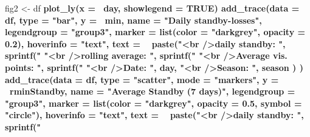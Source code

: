 \documentclass[
]{book}
\newenvironment{Shaded}{\begin{snugshade}}{\end{snugshade}}
\newcommand{\DataTypeTok}[1]{\textcolor[rgb]{0.13,0.29,0.53}{#1}}
\newcommand{\FloatTok}[1]{\textcolor[rgb]{0.00,0.00,0.81}{#1}}
\newcommand{\KeywordTok}[1]{\textcolor[rgb]{0.13,0.29,0.53}{\textbf{#1}}}
\newcommand{\NormalTok}[1]{#1}
\newcommand{\OperatorTok}[1]{\textcolor[rgb]{0.81,0.36,0.00}{\textbf{#1}}}
\newcommand{\OtherTok}[1]{\textcolor[rgb]{0.56,0.35,0.01}{#1}}
\newcommand{\StringTok}[1]{\textcolor[rgb]{0.31,0.60,0.02}{#1}}
\let\oldShaded\Shaded
\let\endoldShaded\endShaded
\renewenvironment{Shaded}{\footnotesize\oldShaded}{\endoldShaded}
\begin{document}
\begin{Shaded}
\begin{Highlighting}[]
{{{{{{{{{{{{{{{{{{{{{{{{{{{{{{{{{{{{{{{{{{{{{{{{{{{{{{{{{{{{{\NormalTok{fig2 <-}\StringTok{ }\NormalTok{df }\OperatorTok{%
\StringTok{  }\KeywordTok{plot_ly}\NormalTok{(}\DataTypeTok{x =} \OperatorTok{~}\NormalTok{day, }\DataTypeTok{showlegend =} \OtherTok{TRUE}\NormalTok{) }\OperatorTok{%
\StringTok{  }\KeywordTok{add_trace}\NormalTok{(}\DataTypeTok{data =}\NormalTok{ df,}
            \DataTypeTok{type =} \StringTok{"bar"}\NormalTok{,}
            \DataTypeTok{y =} \OperatorTok{~}\NormalTok{min,}
            \DataTypeTok{name =} \StringTok{"Daily standby-losses"}\NormalTok{,}
            \DataTypeTok{legendgroup =} \StringTok{"group3"}\NormalTok{,}
            \DataTypeTok{marker =} \KeywordTok{list}\NormalTok{(}\DataTypeTok{color =} \StringTok{"darkgrey"}\NormalTok{, }\DataTypeTok{opacity =} \FloatTok{0.2}\NormalTok{),}
            \DataTypeTok{hoverinfo =} \StringTok{"text"}\NormalTok{,}
            \DataTypeTok{text =} \OperatorTok{~}\StringTok{ }\KeywordTok{paste}\NormalTok{(}\StringTok{"<br />daily standby:           "}\NormalTok{, }\KeywordTok{sprintf}\NormalTok{(}\StringTok{"%
                           \StringTok{"<br />rolling average:        "}\NormalTok{, }\KeywordTok{sprintf}\NormalTok{(}\StringTok{"%
                           \StringTok{"<br />Average vis. points: "}\NormalTok{, }\KeywordTok{sprintf}\NormalTok{(}\StringTok{"%
                           \StringTok{"<br />Date:                        "}\NormalTok{, day,}
                           \StringTok{"<br />Season:                   "}\NormalTok{, season}
\NormalTok{            )}
\NormalTok{  ) }\OperatorTok{%
\StringTok{  }\KeywordTok{add_trace}\NormalTok{(}\DataTypeTok{data =}\NormalTok{ df,}
            \DataTypeTok{type =} \StringTok{"scatter"}\NormalTok{,}
            \DataTypeTok{mode =} \StringTok{"markers"}\NormalTok{,}
            \DataTypeTok{y =} \OperatorTok{~}\NormalTok{rminStandby,}
            \DataTypeTok{name =} \StringTok{"Average Standby (7 days)"}\NormalTok{,}
            \DataTypeTok{legendgroup =} \StringTok{"group3"}\NormalTok{,}
            \DataTypeTok{marker =} \KeywordTok{list}\NormalTok{(}\DataTypeTok{color =} \StringTok{"darkgrey"}\NormalTok{, }\DataTypeTok{opacity =} \FloatTok{0.5}\NormalTok{, }\DataTypeTok{symbol =} \StringTok{"circle"}\NormalTok{),}
            \DataTypeTok{hoverinfo =} \StringTok{"text"}\NormalTok{,}
            \DataTypeTok{text =} \OperatorTok{~}\StringTok{ }\KeywordTok{paste}\NormalTok{(}\StringTok{"<br />daily standby:           "}\NormalTok{, }\KeywordTok{sprintf}\NormalTok{(}\StringTok{"%
}}}}}}}}}}}}}}}}}}}}}}}}}}}}}}}}}}}}}}}}}}}}}}}}}}}}}}}}}}}}}}}}}}}}
\end{Highlighting}
\end{Shaded}
\end{document}
